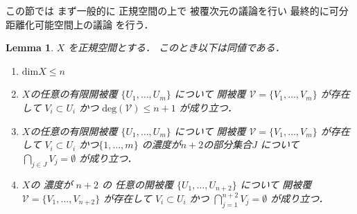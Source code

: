 \documentclass[leqno, a4paper, 12pt]{jsarticle}
\theoremstyle{plain}
\newtheorem{lem}[thm]{Lemma}
\theoremstyle{definition}
\theoremstyle{remark}
\newcommand{\yodim}{\mathrm{dim}}
\newcommand{\yodeg}{\mathrm{deg}}
\newcommand{\yocovf}[1]{\mathscr{#1}}
\numberwithin{equation}{section}
\begin{document}
この節では
まず一般的に
正規空間の上で
被覆次元の議論を行い
最終的に可分距離化可能空間上の議論
を行う．
\begin{lem}\label{lem:hihukudim}
$X$
を正規空間とする．
このとき以下は同値である．
\begin{enumerate}[label=\textup{(\arabic*)}]
\item\label{item:lem:dimn} 
$\yodim X\le n$
\item\label{item:lem:degn+2} 

$X$の任意の有限開被覆
$\{U_{1}, \dots, U_{m}\}$
について
開被覆
$\yocovf{V}=\{V_{1}, \dots, V_{m}\}$
が存在して
$V_{i}\subset U_{i}$
かつ
$\yodeg(\yocovf{V})\le n+1$
が成り立つ．
\item\label{item:lem:n+20} 
$X$の任意の有限開被覆
$\{U_{1}, \dots, U_{m}\}$
について
開被覆
$\yocovf{V}=\{V_{1}, \dots, V_{m}\}$
が存在して
$V_{i}\subset U_{i}$
かつ$\{1, \dots, m\}$
の濃度が$n+2$の部分集合$J$
について
$\bigcap_{j\in J}V_{j}=\emptyset$
が成り立つ．
\item\label{item:lem:n+2n+2} 
$X$の
濃度が
$n+2$
の
任意の開被覆
$\{U_{1}, \dots, U_{n+2}\}$
について
開被覆
$\yocovf{V}=\{V_{1}, \dots, V_{n+2}\}$
が存在して
$V_{i}\subset U_{i}$
かつ
$\bigcap_{j=1}^{n+2}V_{j}=\emptyset$
が成り立つ．
\end{enumerate}
\end{lem}
\end{document}
